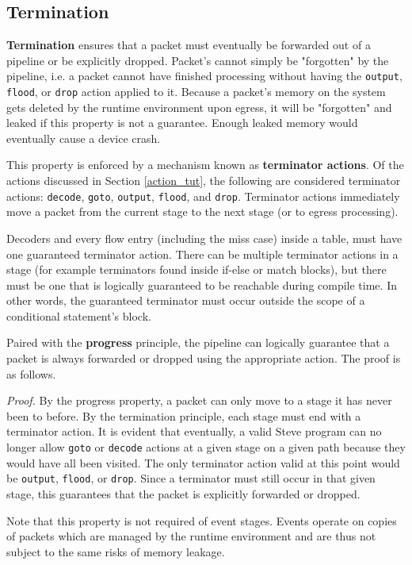 \subsection{Termination} \label{termination_guide}

\textbf{Termination} ensures that a packet must eventually be forwarded out of a pipeline or be explicitly dropped. Packet's cannot simply be "forgotten" by the pipeline, i.e. a packet cannot have finished processing without having the \texttt{output}, \texttt{flood}, or \texttt{drop} action applied to it. Because a packet's memory on the system gets deleted by the runtime environment upon egress, it will be "forgotten" and leaked if this property is not a guarantee. Enough leaked memory would eventually cause a device crash.

This property is enforced by a mechanism known as \textbf{terminator actions}. Of the actions discussed in Section \ref{action_tut}, the following are considered terminator actions: \texttt{decode}, \texttt{goto}, \texttt{output}, \texttt{flood}, and \texttt{drop}. Terminator actions immediately move a packet from the current stage to the next stage (or to egress processing). 

Decoders and every flow entry (including the miss case) inside a table, must have one guaranteed terminator action. There can be multiple terminator actions in a stage (for example terminators found inside if-else or match blocks), but there must be one that is logically guaranteed to be reachable during compile time. In other words, the guaranteed terminator must occur outside the scope of a conditional statement's block.

Paired with the \textbf{progress} principle, the pipeline can logically guarantee that a packet is always forwarded or dropped using the appropriate action. The proof is as follows.

\textit{Proof.} By the progress property, a packet can only move to a stage it has never been to before. By the termination principle, each stage must end with a terminator action. It is evident that eventually, a valid Steve program can no longer allow \texttt{goto} or \texttt{decode} actions at a given stage on a given path because they would have all been visited. The only terminator action valid at this point would be \texttt{output}, \texttt{flood}, or \texttt{drop}. Since a terminator must still occur in that given stage, this guarantees that the packet is explicitly forwarded or dropped.

Note that this property is not required of event stages. Events operate on copies of packets which are managed by the runtime environment and are thus not subject to the same risks of memory leakage.

